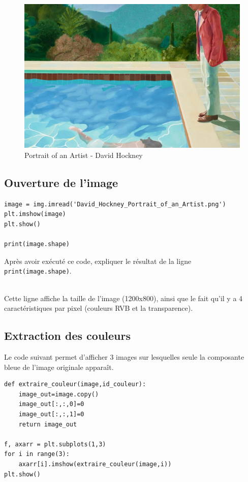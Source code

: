 \begin{figure}[ht!]
	\begin{center}
		\includegraphics[width=0.7\linewidth]{David_Hockney_Portrait_of_an_Artist.png}
	\end{center}
	\caption{Portrait of an Artist - David Hockney}
	\label{img1}
\end{figure}

\subsection{Ouverture de l'image}

\begin{verbatim}
image = img.imread('David_Hockney_Portrait_of_an_Artist.png')
plt.imshow(image)
plt.show()

print(image.shape)
\end{verbatim} 

\begin{exercice}
Après avoir exécuté ce code, expliquer le résultat de la ligne \verb?print(image.shape)?.
\end{exercice}

\begin{solution}~\ \\
Cette ligne affiche la taille de l'image (1200x800), ainsi que le fait qu'il y a 4 caractéristiques par pixel (couleurs RVB et la transparence).
\end{solution}

\subsection{Extraction des couleurs}

Le code suivant permet d'afficher 3 images sur lesquelles seule la composante bleue de l'image originale apparaît.

\begin{verbatim}
def extraire_couleur(image,id_couleur):
    image_out=image.copy()
    image_out[:,:,0]=0
    image_out[:,:,1]=0
    return image_out

f, axarr = plt.subplots(1,3)
for i in range(3):
    axarr[i].imshow(extraire_couleur(image,i))
plt.show()
\end{verbatim} 

